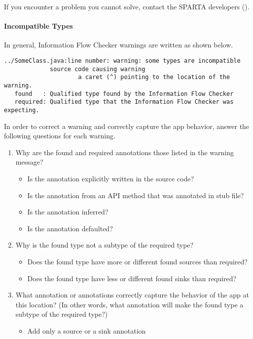 If you encounter a problem you cannot solve, contact the SPARTA developers ().

\paragraph{Incompatible Types}

In general, 
Information Flow Checker warnings are written as shown below.

\begin{Verbatim}  
../SomeClass.java:line number: warning: some types are incompatible 
             source code causing warning
                     a caret (^) pointing to the location of the warning.
   found   : Qualified type found by the Information Flow Checker
   required: Qualified type that the Information Flow Checker was expecting.
\end{Verbatim}
 
In order to correct a warning and correctly capture the app behavior, answer 
the following questions for each warning.
\begin{enumerate}
\item Why are the found and required annotations those listed in the warning message?
   \begin{itemize}
    \item Is the annotation explicitly written in the source code? 
    \item Is the annotation from an API method that was annotated in stub file? 
    \item Is the annotation inferred? 
    \item Is the annotation defaulted? 
    \end{itemize}
\item Why is the found type not a subtype of the required type? 
  \begin{itemize}
   \item Does the found type have more or different found sources than required?
   \item Does the found type have less or different found sinks than required? 
   \end{itemize}
\item What annotation or annotations correctly capture the behavior of the app at
  this location? (In other words, what annotation will make the found type a 
  subtype of the required type?)
   \begin{itemize}
   \item Add only a source or a sink annotation
   \end{itemize}
\end{enumerate}

